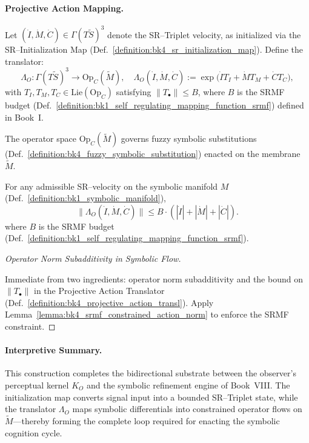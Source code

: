 \paragraph{Projective Action Mapping.}
\begin{definition}
\label{definition:bk4_projective_action_transl}
Let $(\dot{I}, \dot{M}, \dot{C}) \in \Gamma(T\widetilde{S})^3$ denote the SR--Triplet velocity,
as initialized via the SR--Initialization Map (Def.~\ref{definition:bk4_sr_initialization_map}).
Define the translator:
\[
\Lambda_O\colon \Gamma(T\widetilde{S})^3 \to \mathrm{Op}_C(\widetilde{M}), \quad
\Lambda_O(\dot{I}, \dot{M}, \dot{C}) :=
\exp\bigl(\dot{I} T_I + \dot{M} T_M + \dot{C} T_C\bigr),
\]
with $T_I, T_M, T_C \in \mathrm{Lie}(\mathrm{Op}_C)$ satisfying $\|T_\bullet\| \leq B$, where $B$ is the SRMF budget (Def.~\ref{definition:bk1_self_regulating_mapping_function_srmf}) defined in Book~I.

The operator space $\mathrm{Op}_C(\widetilde{M})$ governs fuzzy symbolic substitutions
(Def.~\ref{definition:bk4_fuzzy_symbolic_substitution}) enacted on the membrane $\widetilde{M}$.
\end{definition}
\begin{lemma}
\label{lemma:bk4_srmf_constrained_action_norm}
For any admissible SR--velocity on the symbolic manifold $M$ (Def.~\ref{definition:bk1_symbolic_manifold}),
\[
\|\Lambda_O(\dot{I}, \dot{M}, \dot{C})\| \leq
B \cdot (|\dot{I}| + |\dot{M}| + |\dot{C}|).
\]
where $B$ is the SRMF budget (Def.~\ref{definition:bk1_self_regulating_mapping_function_srmf}).
\end{lemma}
\begin{proof}[Operator Norm Subadditivity in Symbolic Flow]
\label{proof:bk4_operator_norm_subadditivity}
\leavevmode

Immediate from two ingredients: operator norm subadditivity and the bound on $\|T_\bullet\|$ in the Projective Action Translator (Def.~\ref{definition:bk4_projective_action_transl}).
Apply Lemma~\ref{lemma:bk4_srmf_constrained_action_norm} to enforce the SRMF constraint.
\end{proof}
\paragraph{Interpretive Summary.}
This construction completes the bidirectional substrate between the observer's perceptual kernel $K_O$ and the symbolic refinement engine of Book~VIII. The initialization map converts signal input into a bounded SR--Triplet state, while the translator $\Lambda_O$ maps symbolic differentials into constrained operator flows on $\widetilde{M}$---thereby forming the complete loop required for enacting the symbolic cognition cycle.
